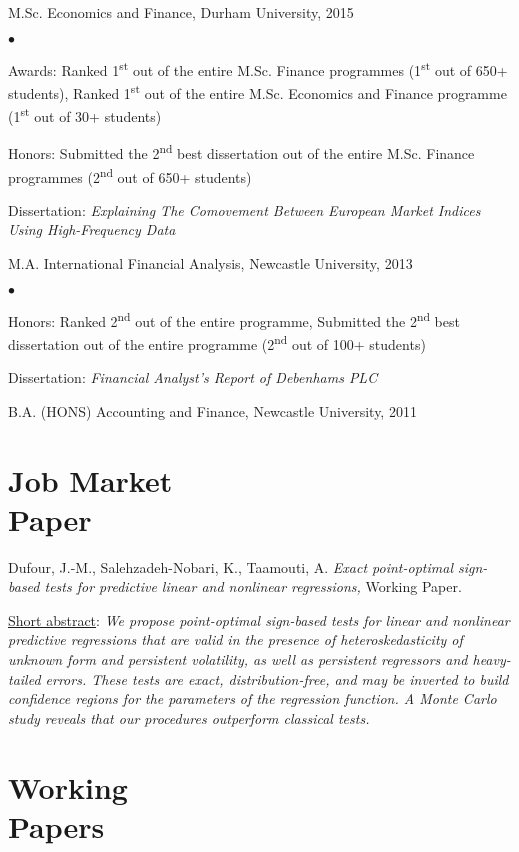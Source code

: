 \documentclass[margin,line,pifont,palatino,courier]{res}
\newcommand{\ts}{\textsuperscript}
\newenvironment{list2}{
  \begin{list}{$\bullet$}{%
      \setlength{\itemsep}{0in}
      \setlength{\parsep}{0in} \setlength{\parskip}{0in}
      \setlength{\topsep}{0in} \setlength{\partopsep}{0in}
      \setlength{\leftmargin}{0.2in}}}{\end{list}}
\begin{document}
\begin{resume}
M.Sc. Economics and Finance, Durham University, 2015
\vspace*{+4ex}
\begin{list2}
\item Awards: Ranked 1\ts{st} out of the entire M.Sc. Finance programmes (1\ts{st} out of 650+ students), Ranked 1\ts{st} out of the entire M.Sc. Economics and Finance programme (1\ts{st} out of 30+ students)
\item Honors: Submitted the 2\ts{nd} best dissertation out of the entire M.Sc. Finance programmes (2\ts{nd} out of 650+ students)
\item Dissertation:  \emph{Explaining The Comovement Between European Market Indices Using High-Frequency Data}
\end{list2}

M.A. International Financial Analysis, Newcastle University, 2013
\vspace*{+4ex}
\begin{list2}
\item Honors: Ranked 2\ts{nd} out of the entire programme, Submitted the 2\ts{nd} best dissertation out of the entire programme (2\ts{nd} out of 100+ students)
\item Dissertation:  \emph{Financial Analyst's Report of Debenhams PLC}
\end{list2}
B.A. (HONS) Accounting and Finance, Newcastle University, 2011

\hrulefill

\section{\sc \bf Job Market\\ Paper}

Dufour, J.-M., Salehzadeh-Nobari, K., Taamouti, A. \emph{Exact point-optimal sign-based tests for predictive linear and nonlinear regressions,} Working Paper.

\underline{Short abstract}: \emph{We propose point-optimal sign-based tests for linear and nonlinear predictive regressions that are valid in the presence of heteroskedasticity of unknown form and persistent volatility, as well as persistent
regressors and heavy-tailed errors. These tests are exact, distribution-free, and may be inverted to
build confidence regions for the parameters of the regression function. A Monte Carlo study reveals
that our procedures outperform classical tests.}

\hrulefill

\section{\sc \bf Working \\
Papers}


\end{resume}
\end{document}
